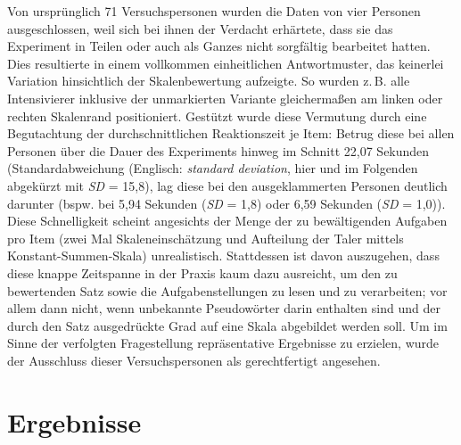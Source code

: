 Von ursprünglich 71 Versuchspersonen wurden die Daten von vier Personen ausgeschlossen, weil sich bei ihnen der Verdacht erhärtete, dass sie das Experiment in Teilen oder auch als Ganzes nicht sorgfältig bearbeitet hatten. Dies resultierte in einem vollkommen einheitlichen Antwortmuster, das keinerlei Variation hinsichtlich der Skalenbewertung aufzeigte. So wurden z.\,B. alle Intensivierer inklusive der unmarkierten Variante gleichermaßen am linken oder rechten Skalenrand positioniert. Gestützt wurde diese Vermutung durch eine Begutachtung der durchschnittlichen Reaktionszeit je Item: Betrug diese bei allen Personen über die Dauer des Experiments hinweg im Schnitt 22,07 Sekunden (Standardabweichung (Englisch: \textit{standard deviation}, hier und im Folgenden abgekürzt mit \textit{SD} = 15,8), lag diese bei den ausgeklammerten Personen deutlich darunter (bspw. bei 5,94 Sekunden ({\textit{SD} = 1,8)} oder 6,59 Sekunden ({\textit{SD} = 1,0))}. Diese Schnelligkeit scheint angesichts der Menge der zu bewältigenden Aufgaben pro Item (zwei Mal Skaleneinschätzung und Aufteilung der Taler mittels Konstant-Summen-Skala) unrealistisch. Stattdessen ist davon auszugehen, dass diese knappe Zeitspanne in der Praxis kaum dazu ausreicht, um den zu bewertenden Satz sowie die Aufgabenstellungen zu lesen und zu verarbeiten; vor allem dann nicht, wenn unbekannte Pseudowörter darin enthalten sind und der durch den Satz ausgedrückte Grad auf eine Skala abgebildet werden soll. Um im Sinne der verfolgten Fragestellung repräsentative Ergebnisse zu erzielen, wurde der Ausschluss dieser Versuchspersonen als gerechtfertigt angesehen.





\section{Ergebnisse}\label{abs:Ergebnisse238}


